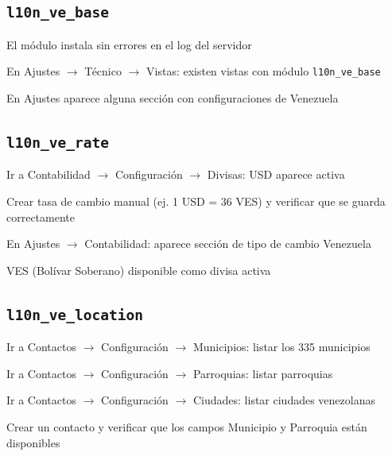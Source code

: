 \documentclass[11pt,a4paper]{article}
\newcommand{\modulo}[1]{\texttt{\textcolor{naranja}{#1}}}
\begin{document}
\begin{Form}
\subsection{\modulo{l10n\_ve\_base}}

\begin{checklist}
  \item El módulo instala sin errores en el log del servidor
  \item En Ajustes $\rightarrow$ Técnico $\rightarrow$ Vistas: existen vistas con módulo \texttt{l10n\_ve\_base}
  \item En Ajustes aparece alguna sección con configuraciones de Venezuela
\end{checklist}

\subsection{\modulo{l10n\_ve\_rate}}

\begin{checklist}
  \item Ir a Contabilidad $\rightarrow$ Configuración $\rightarrow$ Divisas: USD aparece activa
  \item Crear tasa de cambio manual (ej. 1 USD = 36 VES) y verificar que se guarda correctamente
  \item En Ajustes $\rightarrow$ Contabilidad: aparece sección de tipo de cambio Venezuela
  \item VES (Bolívar Soberano) disponible como divisa activa
\end{checklist}

\subsection{\modulo{l10n\_ve\_location}}

\begin{checklist}
  \item Ir a Contactos $\rightarrow$ Configuración $\rightarrow$ Municipios: listar los 335 municipios
  \item Ir a Contactos $\rightarrow$ Configuración $\rightarrow$ Parroquias: listar parroquias
  \item Ir a Contactos $\rightarrow$ Configuración $\rightarrow$ Ciudades: listar ciudades venezolanas
  \item Crear un contacto y verificar que los campos Municipio y Parroquia están disponibles
\end{checklist}


\end{Form}
\end{document}
